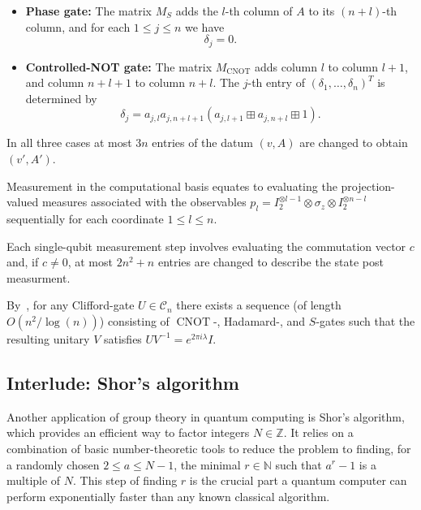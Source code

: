 \documentclass[a4paper, oneside, 12pt]{amsart}
\DeclareMathOperator{\CNOT}{CNOT}
\begin{document}
\begin{remark}
\begin{thmlist}
\begin{itemize}
      \item \textbf{Phase gate:}
      The matrix \(M_S\) adds the \(l\)-th column of \(A\) to its \((n+l)\)-th column, and for each \(1\leq j \leq n\) we have
      \begin{equation*}
        \delta_j = 0.
      \end{equation*}

      \item \textbf{Controlled-NOT gate:}
      The matrix \(M_{\CNOT}\) adds column \(l\) to column \(l+1\), and column \(n+l+1\) to column \(n+l\).
      The \(j\)-th entry of \((\delta_{1}, \dots , \delta_{n})^{T}\) is determined by
      \begin{equation*}
        \delta_j = a_{j,l} a_{j, n+l+1} (a_{j,l+1} \boxplus a_{j, n+l} \boxplus 1).
      \end{equation*}
    \end{itemize}
    In all three cases at most \(3n\) entries of the datum \((v,A)\) are changed to obtain \((v', A')\).
    \item Measurement in the computational basis equates to evaluating the projection-valued measures associated with the observables \(p_l = I_{2}^{\otimes l-1} \otimes \sigma_z \otimes I_{2}^{\otimes n-l}\) sequentially for each coordinate \(1 \leq l \leq n\).

    Each single-qubit measurement step involves evaluating the commutation vector \(c\) and, if \(c \neq 0\), at most \(2n^{2}+n\) entries are changed to describe the state post measurment.
  \end{thmlist}
\end{remark}

By~\cite{aaronson-gottesman2004:ImprovedSimulationStabiliserCircuits}, for any Clifford-gate \(U\in \mathcal{C}_{n}\) there exists a sequence (of length \(O(n^{2}/\log(n))\)) consisting of \(\CNOT\)-, Hadamard-, and \(S\)-gates such that the resulting unitary \(V\) satisfies \(UV^{-1}=e^{2\pi i \lambda} I\).

\subsection{Interlude: Shor's algorithm}\label{sec:interlude:-shor's-algorithm}
Another application of group theory in quantum computing is Shor's algorithm, which provides an efficient way to factor integers \( N \in \mathbb{Z} \).
It relies on a combination of basic number-theoretic tools to reduce the problem to finding, for a randomly chosen \( 2 \leq a \leq N-1 \), the minimal \( r \in \mathbb{N} \) such that \( a^r - 1 \) is a multiple of \( N \).
This step of finding \( r \) is the crucial part a quantum computer can perform exponentially faster than any known classical algorithm.
\end{document}
